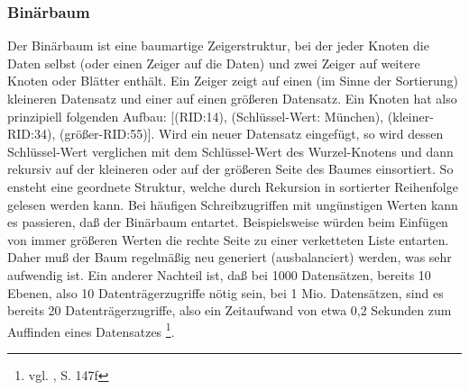 \subsubsection{Binärbaum}
Der Binärbaum ist eine baumartige Zeigerstruktur, bei der jeder Knoten die Daten selbst (oder einen Zeiger auf die Daten) und zwei Zeiger auf weitere Knoten oder Blätter enthält. Ein Zeiger zeigt auf einen (im Sinne der Sortierung) kleineren Datensatz und einer auf einen größeren Datensatz. Ein Knoten hat also prinzipiell folgenden Aufbau:
 [(RID:14), (Schlüssel-Wert: München), (kleiner-RID:34), (größer-RID:55)].
Wird ein neuer Datensatz eingefügt, so wird dessen Schlüssel-Wert verglichen mit dem Schlüssel-Wert des Wurzel-Knotens und dann rekursiv auf der kleineren oder auf der größeren Seite des Baumes einsortiert. So ensteht eine geordnete Struktur, welche durch Rekursion in sortierter Reihenfolge gelesen werden kann. Bei häufigen Schreibzugriffen mit ungünstigen Werten kann es passieren, daß der Binärbaum entartet. Beispielsweise würden beim Einfügen von immer größeren Werten die rechte Seite zu einer verketteten Liste entarten. Daher muß der Baum regelmäßig neu generiert (ausbalanciert) werden, was sehr aufwendig ist. Ein anderer Nachteil ist, daß bei 1000 Datensätzen, bereits 10 Ebenen, also 10 Datenträgerzugriffe nötig sein, bei 1 Mio. Datensätzen, sind es bereits 20 Datenträgerzugriffe, also ein Zeitaufwand von etwa 0,2 Sekunden zum Auffinden eines Datensatzes \footnote{vgl. \cite{Sauer1998}, S. 147f}.
